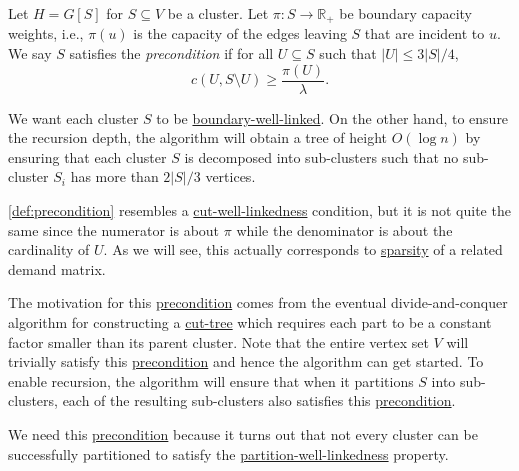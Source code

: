 \begin{definition}[Precondition]\label{def:precondition}
	Let \(H= G[S]\) for \(S \subseteq V\) be a cluster. Let \(\pi \colon S \to \mathbb{R} _{+}\) be boundary capacity weights, i.e., \(\pi (u)\) is the capacity of the edges leaving \(S\) that are incident to \(u\). We say \(S\) satisfies the \emph{precondition} if for all \(U \subseteq S\) such that \(\lvert U \rvert \leq 3 \lvert S \rvert / 4\),
	\[
		c(U, S \setminus U)
		\geq \frac{\pi (U)}{\lambda }.
	\]
\end{definition}

\begin{intuition}
	We want each cluster \(S\) to be \hyperref[def:boundary-well-linked]{boundary-well-linked}. On the other hand, to ensure the recursion depth, the algorithm will obtain a tree of height \(O(\log n)\) by ensuring that each cluster \(S\) is decomposed into sub-clusters such that no sub-cluster \(S_i\) has more than \(2 \lvert S \rvert / 3\) vertices.
\end{intuition}

\autoref{def:precondition} resembles a \hyperref[def:cut-well-linked]{cut-well-linkedness} condition, but it is not quite the same since the numerator is about \(\pi \) while the denominator is about the cardinality of \(U\). As we will see, this actually corresponds to \hyperref[def:sparsity]{sparsity} of a related demand matrix.

The motivation for this \hyperref[def:precondition]{precondition} comes from the eventual divide-and-conquer algorithm for constructing a \hyperref[def:cut-tree]{cut-tree} which requires each part to be a constant factor smaller than its parent cluster. Note that the entire vertex set \(V\) will trivially satisfy this \hyperref[def:precondition]{precondition} and hence the algorithm can get started. To enable recursion, the algorithm will ensure that when it partitions \(S\) into sub-clusters, each of the resulting sub-clusters also satisfies this \hyperref[def:precondition]{precondition}.

\begin{intuition}
	We need this \hyperref[def:precondition]{precondition} because it turns out that not every cluster can be successfully partitioned to satisfy the \hyperref[def:partition-and-boundary-well-linked]{partition-well-linkedness} property.
\end{intuition}

